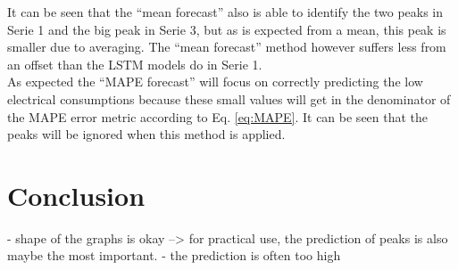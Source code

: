 It can be seen that the ``mean forecast'' also is able to identify the two peaks in Serie 1 and the big peak in Serie 3, but as is expected from a mean, this peak is smaller due to averaging. The ``mean forecast'' method however suffers less from an offset than the LSTM models do in Serie 1.\\
As expected the ``MAPE forecast'' will focus on correctly predicting the low electrical consumptions because these small values will get in the denominator of the MAPE error metric according to Eq. \ref{eq:MAPE}. It can be seen that the peaks will be ignored when this method is applied. 
\clearpage
\section{Conclusion}


- shape of the graphs is okay --> for practical use, the prediction of peaks is also maybe the most important.
- the prediction is often too high

